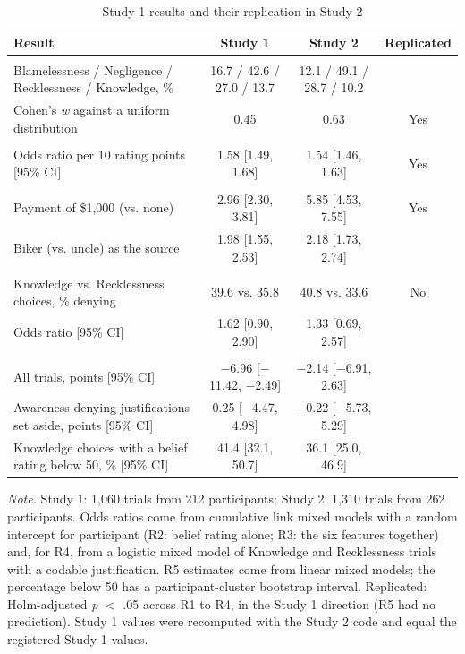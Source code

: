 \begin{table}[H]
\centering
\caption{Study 1 results and their replication in Study 2}
\label{tab:replication}
\footnotesize
\begin{tabular}{p{6.2cm}ccc}
\toprule
Result & Study 1 & Study 2 & Replicated \\
\midrule
\addlinespace
\multicolumn{4}{l}{\textit{Distribution of choices (R1)}} \tabularnewline
\raggedright Blamelessness / Negligence / Recklessness / Knowledge, \% & 16.7 / 42.6 / 27.0 / 13.7 & 12.1 / 49.1 / 28.7 / 10.2 &  \tabularnewline
\raggedright Cohen's \textit{w} against a uniform distribution & 0.45 & 0.63 & Yes \tabularnewline
\addlinespace
\multicolumn{4}{l}{\textit{Belief rating and culpability (R2)}} \tabularnewline
\raggedright Odds ratio per 10 rating points [95\% CI] & 1.58 [1.49, 1.68] & 1.54 [1.46, 1.63] & Yes \tabularnewline
\addlinespace
\multicolumn{4}{l}{\textit{Vignette features, odds ratio [95\% CI] (R3)}} \tabularnewline
\raggedright Payment of \$1,000 (vs. none) & 2.96 [2.30, 3.81] & 5.85 [4.53, 7.55] & Yes \tabularnewline
\raggedright Biker (vs. uncle) as the source & 1.98 [1.55, 2.53] & 2.18 [1.73, 2.74] &  \tabularnewline
\addlinespace
\multicolumn{4}{l}{\textit{Awareness-denying justifications (R4)}} \tabularnewline
\raggedright Knowledge vs. Recklessness choices, \% denying & 39.6 vs. 35.8 & 40.8 vs. 33.6 & No \tabularnewline
\raggedright Odds ratio [95\% CI] & 1.62 [0.90, 2.90] & 1.33 [0.69, 2.57] &  \tabularnewline
\addlinespace
\multicolumn{4}{l}{\textit{Knowledge minus Recklessness choices, belief rating (R5)}} \tabularnewline
\raggedright All trials, points [95\% CI] & $-$6.96 [$-$11.42, $-$2.49] & $-$2.14 [$-$6.91, 2.63] &  \tabularnewline
\raggedright Awareness-denying justifications set aside, points [95\% CI] & 0.25 [$-$4.47, 4.98] & $-$0.22 [$-$5.73, 5.29] &  \tabularnewline
\raggedright Knowledge choices with a belief rating below 50, \% [95\% CI] & 41.4 [32.1, 50.7] & 36.1 [25.0, 46.9] &  \tabularnewline
\bottomrule
\end{tabular}

\vspace{0.5em}
\begin{flushleft}
\footnotesize
\textit{Note.} Study 1: 1,060 trials from 212 participants; Study 2: 1,310 trials from 262 participants. Odds ratios come from cumulative link mixed models with a random intercept for participant (R2: belief rating alone; R3: the six features together) and, for R4, from a logistic mixed model of Knowledge and Recklessness trials with a codable justification. R5 estimates come from linear mixed models; the percentage below 50 has a participant-cluster bootstrap interval. Replicated: Holm-adjusted \textit{p} $<$ .05 across R1 to R4, in the Study 1 direction (R5 had no prediction). Study 1 values were recomputed with the Study 2 code and equal the registered Study 1 values.
\end{flushleft}
\end{table}
